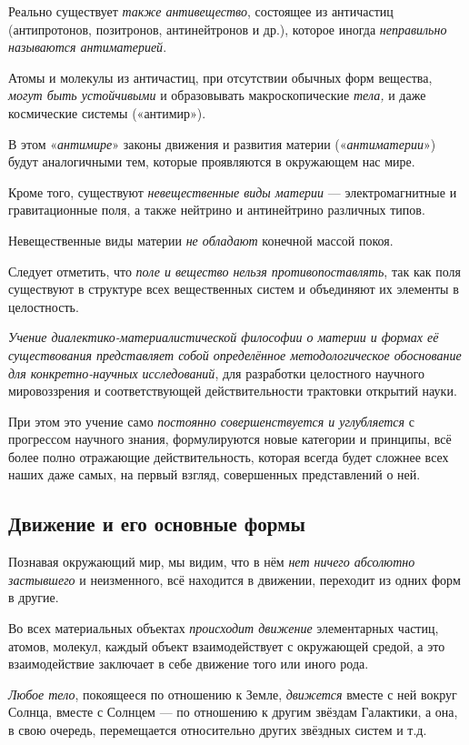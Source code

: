 \documentclass[a4paper,14pt,russian]{extreport}
\begin{document}
Реально существует \emph{также антивещество}, состоящее из античастиц (антипротонов, позитронов, антинейтронов и др.), которое иногда \emph{неправильно называются антиматерией}.

Атомы и молекулы из античастиц, при отсутствии обычных форм вещества, \emph{могут быть устойчивыми} и образовывать макроскопические \emph{тела,} и даже космические системы («антимир»).

В этом «\emph{антимире}» законы движения и развития материи («\emph{антиматерии}») будут аналогичными тем, которые проявляются в окружающем нас мире.

Кроме того, существуют \emph{невещественные виды материи} --- электромагнитные и гравитационные поля, а также нейтрино и антинейтрино различных типов.

Невещественные виды материи \emph{не обладают} конечной массой покоя.

Следует отметить, что \emph{поле и вещество нельзя противопоставлять}, так как поля существуют в структуре всех вещественных систем и объединяют их элементы в целостность.

\emph{Учение диалектико-материалистической философии о материи и формах её существования представляет собой определённое методологическое обоснование для конкретно-научных исследований}, для разработки целостного научного мировоззрения и соответствующей действительности трактовки открытий науки.

При этом это учение само \emph{постоянно совершенствуется и углубляется} с прогрессом научного знания, формулируются новые категории и принципы, всё более полно отражающие действительность, которая всегда будет сложнее всех наших даже самых, на первый взгляд, совершенных представлений о ней.

\subsection{Движение и его основные формы}

Познавая окружающий мир, мы видим, что в нём \emph{нет ничего абсолютно застывшего} и неизменного, всё находится в движении, переходит из одних форм в другие.

Во всех материальных объектах \emph{происходит движение} элементарных частиц, атомов, молекул, каждый объект взаимодействует с окружающей средой, а это взаимодействие заключает в себе движение того или иного рода.

\emph{Любое тело}, покоящееся по отношению к Земле, \emph{движется} вместе с ней вокруг Солнца, вместе с Солнцем --- по отношению к другим звёздам Галактики, а она, в свою очередь, перемещается относительно других звёздных систем и т.д.
\end{document}
